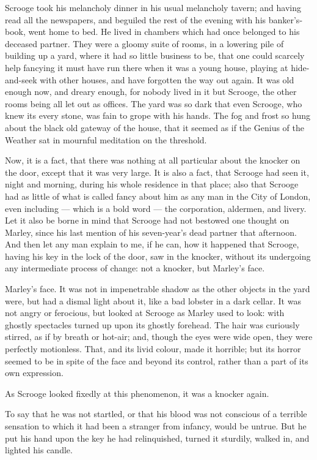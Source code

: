 \documentclass[11pt,twoside]{article}\makeatletter
\begin{document}
Scrooge took his melancholy dinner in his usual melancholy tavern; and having read all the newspapers, and beguiled the rest of the evening with his banker's-book, went home to bed. He lived in chambers which had once belonged to his deceased partner. They were a gloomy suite of rooms, in a lowering pile of building up a yard, where it had so little business to be, that one could scarcely help fancying it must have run there when it was a young house, playing at hide-and-seek with other houses, and have forgotten the way out again. It was old enough now, and dreary enough, for nobody lived in it but Scrooge, the other rooms being all let out as offices. The yard was so dark that even Scrooge, who knew its every stone, was fain to grope with his hands. The fog and frost so hung about the black old gateway of the house, that it seemed as if the Genius of the Weather sat in mournful meditation on the threshold.\par
Now, it is a fact, that there was nothing at all particular about the knocker on the door, except that it was very large. It is also a fact, that Scrooge had seen it, night and morning, during his whole residence in that place; also that Scrooge had as little of what is called fancy about him as any man in the City of London, even including — which is a bold word — the corporation, aldermen, and livery. Let it also be borne in mind that Scrooge had not bestowed one thought on Marley, since his last mention of his seven-year's dead partner that afternoon. And then let any man explain to me, if he can, how it happened that Scrooge, having his key in the lock of the door, saw in the knocker, without its undergoing any intermediate process of change: not a knocker, but Marley's face. \par
Marley's face. It was not in impenetrable shadow as the other objects in the yard were, but had a dismal light about it, like a bad lobster in a dark cellar. It was not angry or ferocious, but looked at Scrooge as Marley used to look: with ghostly spectacles turned up upon its ghostly forehead. The hair was curiously stirred, as if by breath or hot-air; and, though the eyes were wide open, they were perfectly motionless. That, and its livid colour, made it horrible; but its horror seemed to be in spite of the face and beyond its control, rather than a part of its own expression. \par
As Scrooge looked fixedly at this phenomenon, it was a knocker again. \par
To say that he was not startled, or that his blood was not conscious of a terrible sensation to which it had been a stranger from infancy, would be untrue. But he put his hand upon the key he had relinquished, turned it sturdily, walked in, and lighted his candle. \par
\end{document}
